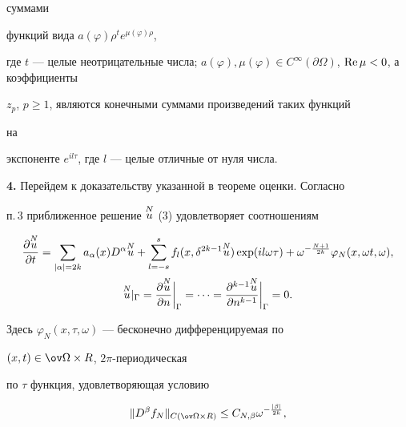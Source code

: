суммами  


функций вида $a(\varphi)\rho^t e^{\mu(\varphi)\rho}$, 


где $t$ --- целые неотрицательные числа; $a(\varphi),\mu(\varphi)\in 


C^\infty(\partial\Omega)$, $\re\mu<0$, а коэффициенты 


$z_p$, $p\ge1$, являются конечными суммами произведений таких функций 


на  


экспоненте $e^{i l\tau}$, где $l$ --- целые отличные от нуля числа. 


\medskip 


 


{\bf 4.} Перейдем к доказательству указанной в теореме оценки. Согласно 


п.\,3 приближенное решение $\overset{N}{u}{}$ (3) удовлетворяет соотношениям 


\begin{gather*} 


\frac{\partial\up{N}{u}}{\partial t}=\sum_{|\alpha|=2k} 


a_\alpha(x)D^\alpha\up{N}{u}+\sum^s_{l=-s}f_l 


(x,\delta^{2k-1}\up{N}{u})\exp(i l\omega\tau)+ 


\omega^{-\frac{N+1}{2k}}\varphi_N(x,\omega t,\omega), \\ 


% 


\up{N}{u}|_{\Gamma}= 


\frac{\partial\up{N}{u}}{\partial n}\bigg|_{\Gamma}= 


\dotsb=\frac{\partial^{k-1}\up{N}{u}}{\partial n^{k-1}} 


\bigg|_{\Gamma}=0. 


\end{gather*} 


Здесь $\varphi_N(x,\tau,\omega)$ --- бесконечно дифференцируемая по 


$(x,t)\in\ov\Omega\times R$, $2\pi$-периодическая 


по $\tau$ функция, удовлетворяющая условию 


\begin{equation} 


\|D^\beta f_N\|_{C(\ov\Omega\times R)}\le C_{N,\beta} 


\omega^{-\frac{|\beta|}{2k}}, 


\end{equation} 


